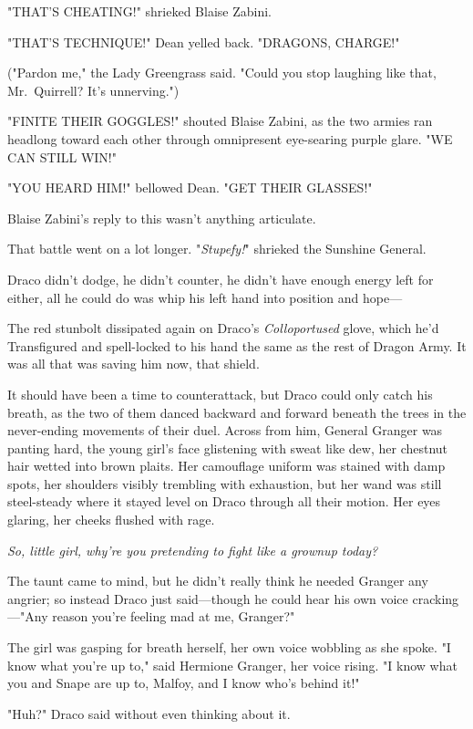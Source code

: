 "THAT'S CHEATING!" shrieked Blaise Zabini.

"THAT'S TECHNIQUE!" Dean yelled back. "DRAGONS, CHARGE!"

("Pardon me," the Lady Greengrass said. "Could you stop laughing like that, 
Mr.~Quirrell? It's unnerving.")

"FINITE THEIR GOGGLES!" shouted Blaise Zabini, as the two armies ran headlong 
toward each other through omnipresent eye-searing purple glare. "WE CAN STILL 
WIN!"

"YOU HEARD HIM!" bellowed Dean. "GET THEIR GLASSES!"

Blaise Zabini's reply to this wasn't anything articulate.

That battle went on a lot longer.
\sbreak
"\emph{Stupefy!}" shrieked the Sunshine General.

Draco didn't dodge, he didn't counter, he didn't have enough energy left for 
either, all he could do was whip his left hand into position and hope---

The red stunbolt dissipated again on Draco's \emph{Colloportused} glove, which 
he'd Transfigured and spell-locked to his hand the same as the rest of Dragon 
Army. It was all that was saving him now, that shield.

It should have been a time to counterattack, but Draco could only catch his 
breath, as the two of them danced backward and forward beneath the trees in the 
never-ending movements of their duel. Across from him, General Granger was 
panting hard, the young girl's face glistening with sweat like dew, her 
chestnut hair wetted into brown plaits. Her camouflage uniform was stained with 
damp spots, her shoulders visibly trembling with exhaustion, but her wand was 
still steel-steady where it stayed level on Draco through all their motion. Her 
eyes glaring, her cheeks flushed with rage.

\emph{So, little girl, why're you pretending to fight like a grownup today?}

The taunt came to mind, but he didn't really think he needed Granger any 
angrier; so instead Draco just said---though he could hear his own voice 
cracking---"Any reason you're feeling mad at me, Granger?"

The girl was gasping for breath herself, her own voice wobbling as she spoke. 
"I know what you're up to," said Hermione Granger, her voice rising. "I know 
what you and Snape are up to, Malfoy, and I know who's behind it!"

"Huh?" Draco said without even thinking about it.

